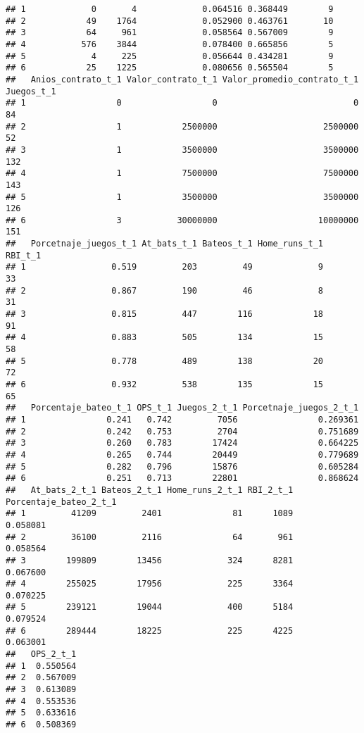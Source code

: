 \documentclass[
]{article}
\begin{document}
\begin{verbatim}
## 1             0       4             0.064516 0.368449        9
## 2            49    1764             0.052900 0.463761       10
## 3            64     961             0.058564 0.567009        9
## 4           576    3844             0.078400 0.665856        5
## 5             4     225             0.056644 0.434281        9
## 6            25    1225             0.080656 0.565504        5
##   Anios_contrato_t_1 Valor_contrato_t_1 Valor_promedio_contrato_t_1 Juegos_t_1
## 1                  0                  0                           0         84
## 2                  1            2500000                     2500000         52
## 3                  1            3500000                     3500000        132
## 4                  1            7500000                     7500000        143
## 5                  1            3500000                     3500000        126
## 6                  3           30000000                    10000000        151
##   Porcetnaje_juegos_t_1 At_bats_t_1 Bateos_t_1 Home_runs_t_1 RBI_t_1
## 1                 0.519         203         49             9      33
## 2                 0.867         190         46             8      31
## 3                 0.815         447        116            18      91
## 4                 0.883         505        134            15      58
## 5                 0.778         489        138            20      72
## 6                 0.932         538        135            15      65
##   Porcentaje_bateo_t_1 OPS_t_1 Juegos_2_t_1 Porcetnaje_juegos_2_t_1
## 1                0.241   0.742         7056                0.269361
## 2                0.242   0.753         2704                0.751689
## 3                0.260   0.783        17424                0.664225
## 4                0.265   0.744        20449                0.779689
## 5                0.282   0.796        15876                0.605284
## 6                0.251   0.713        22801                0.868624
##   At_bats_2_t_1 Bateos_2_t_1 Home_runs_2_t_1 RBI_2_t_1 Porcentaje_bateo_2_t_1
## 1         41209         2401              81      1089               0.058081
## 2         36100         2116              64       961               0.058564
## 3        199809        13456             324      8281               0.067600
## 4        255025        17956             225      3364               0.070225
## 5        239121        19044             400      5184               0.079524
## 6        289444        18225             225      4225               0.063001
##   OPS_2_t_1
## 1  0.550564
## 2  0.567009
## 3  0.613089
## 4  0.553536
## 5  0.633616
## 6  0.508369
\end{verbatim}
\end{document}
